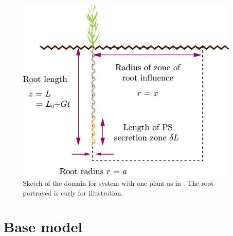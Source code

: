 \documentclass[11pt]{article}
\begin{document}
\begin{figure}
    \centering
    \includegraphics[scale=0.7]{Figures/First-plot.pdf}
    \caption{Sketch of the domain for system with one plant as in \cite{Ptashnyk-2011}. The root portrayed is curly for illustration.}
    \label{fig:geom}
\end{figure}
\newpage

\section{Base model}
\end{document}
